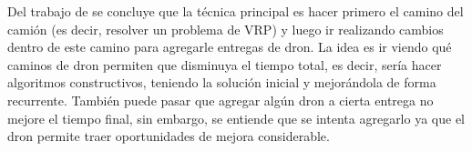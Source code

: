 Del trabajo de \cite{moshrefjavadi2021applications} se concluye que la técnica principal es hacer primero el camino del camión (es decir, resolver un problema de VRP) y luego ir realizando cambios dentro de este camino para agregarle entregas de dron. La idea es ir viendo qué caminos de dron permiten que disminuya el tiempo total, es decir, sería hacer algoritmos constructivos, teniendo la solución inicial y mejorándola de forma recurrente. También puede pasar que agregar algún dron a cierta entrega no mejore el tiempo final, sin embargo, se entiende que se intenta agregarlo ya que el dron permite traer oportunidades de mejora considerable.
